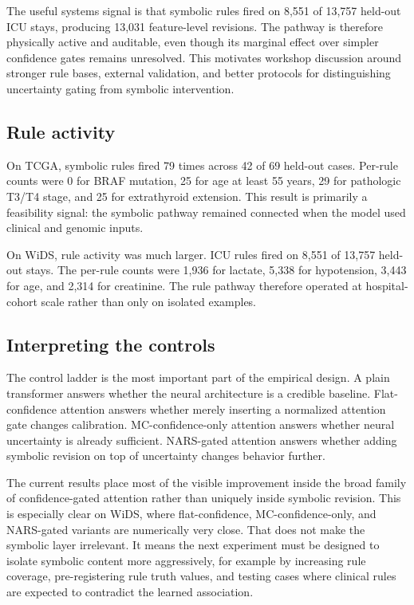 \documentclass{article}
\begin{document}
The useful systems signal is that symbolic rules fired on 8,551 of 13,757 held-out ICU stays, producing 13,031 feature-level revisions. The pathway is therefore physically active and auditable, even though its marginal effect over simpler confidence gates remains unresolved. This motivates workshop discussion around stronger rule bases, external validation, and better protocols for distinguishing uncertainty gating from symbolic intervention.

\subsection{Rule activity}

On TCGA, symbolic rules fired 79 times across 42 of 69 held-out cases. Per-rule counts were 0 for BRAF mutation, 25 for age at least 55 years, 29 for pathologic T3/T4 stage, and 25 for extrathyroid extension. This result is primarily a feasibility signal: the symbolic pathway remained connected when the model used clinical and genomic inputs.

On WiDS, rule activity was much larger. ICU rules fired on 8,551 of 13,757 held-out stays. The per-rule counts were 1,936 for lactate, 5,338 for hypotension, 3,443 for age, and 2,314 for creatinine. The rule pathway therefore operated at hospital-cohort scale rather than only on isolated examples.

\subsection{Interpreting the controls}

The control ladder is the most important part of the empirical design. A plain transformer answers whether the neural architecture is a credible baseline. Flat-confidence attention answers whether merely inserting a normalized attention gate changes calibration. MC-confidence-only attention answers whether neural uncertainty is already sufficient. NARS-gated attention answers whether adding symbolic revision on top of uncertainty changes behavior further.

The current results place most of the visible improvement inside the broad family of confidence-gated attention rather than uniquely inside symbolic revision. This is especially clear on WiDS, where flat-confidence, MC-confidence-only, and NARS-gated variants are numerically very close. That does not make the symbolic layer irrelevant. It means the next experiment must be designed to isolate symbolic content more aggressively, for example by increasing rule coverage, pre-registering rule truth values, and testing cases where clinical rules are expected to contradict the learned association.
\end{document}
